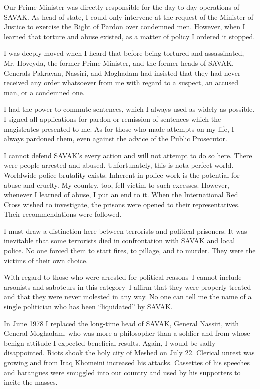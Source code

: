 Our Prime Minister was directly responsible for the day-to-day operations of SAVAK. As head of state, I could only intervene at the request of the Minister of Justice to exercise the Right of Pardon over condemned men. However, when I learned that torture and abuse existed, as a matter of policy I ordered it stopped. 

I was deeply moved when I heard that before being tortured and assassinated, Mr. Hoveyda, the former Prime Minister, and the former heads of SAVAK, Generals Pakravan, Nassiri, and Moghadam had insisted that they had never received any order whatsoever from me with regard to a suspect, an accused man, or a condemned one. 

I had the power to commute sentences, which I always used as widely as possible. I signed all applications for pardon or remission of sentences which the magistrates presented to me. As for those who made attempts on my life, I always pardoned them, even against the advice of the Public Prosecutor. 

I cannot defend SAVAK’s every action and will not attempt to do so here. There were people arrested and abused. Unfortunately, this is nota perfect world. Worldwide police brutality exists. Inherent in police work is the potential for abuse and cruelty. My country, too, fell victim to such excesses. However, whenever I learned of abuse, I put an end to it. When the International Red Cross wished to investigate, the prisons were opened to their representatives. Their recommendations were followed. 

I must draw a distinction here between terrorists and political prisoners. It was inevitable that some terrorists died in confrontation with SAVAK and local police. No one forced them to start fires, to pillage, and to murder. They were the victims of their own choice. 

With regard to those who were arrested for political reasons--I cannot include arsonists and saboteurs in this category--I affirm that they were properly treated and that they were never molested in any way. No one can tell me the name of a single politician who has been “liquidated” by SAVAK. 

In June 1978 I replaced the long-time head of SAVAK, General Nassiri, with General Moghadam, who was more a philosopher than a soldier and from whose benign attitude I expected beneficial results. Again, I would be sadly disappointed. Riots shook the holy city of Meshed on July 22. Clerical unrest was growing and from Iraq Khomeini increased his attacks. Cassettes of his speeches and harangues were smuggled into our country and used by his supporters to incite the masses. 

